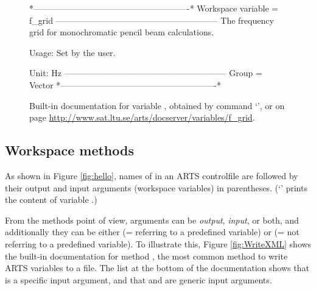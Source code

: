 \begin{figure}
\begin{code}
*-------------------------------------------------------*
Workspace variable = f_grid
---------------------------------------------------------
The frequency grid for monochromatic pencil beam 
calculations.

Usage: Set by the user.
 
Unit:  Hz
---------------------------------------------------------
Group = Vector
*-------------------------------------------------------*
\end{code}
\caption{Built-in documentation for variable , obtained by
  command `', or on page
  \url{http://www.sat.ltu.se/arts/docserver/variables/f_grid}.} 
\label{fig:f_grid}
\end{figure}

\subsection{Workspace methods}
%
As shown in Figure \ref{fig:hello}, names of  in an ARTS
controlfile are followed by their output and input arguments (workspace
variables) in parentheses. (`' prints the content of variable
.)

From the methods point of view, arguments can be \emph{output},
\emph{input}, or both, and additionally they can be either
\emph{} (= referring to a predefined variable) or
\emph{} (= not referring to a predefined
variable). To illustrate this, Figure \ref{fig:WriteXML} shows the
built-in documentation for method , the most
common method to write ARTS variables to a file. The list at the
bottom of the documentation shows that
 is a specific input argument, and
that  and  are generic input
arguments.

